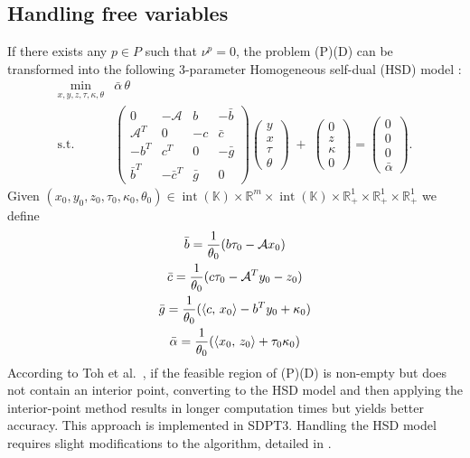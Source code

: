 \subsection{Handling free variables}
If there exists any $p \in P$ such that $\nu^p = 0$, the problem (P)(D) can be transformed into the following 3-parameter Homogeneous self-dual (HSD) model \cite{Wright1997}:
\[
  \begin{array}{cl}
   \min_{x,y,z,\tau,\kappa,\theta} & \bar{\alpha}\,\theta \\[3pt]
   \text{s.t.}
   & \begin{pmatrix}
       0 & -\mathcal{A} & b & -\bar{b}\\
       \mathcal{A}^T & 0 & -c & \bar{c}\\
       -b^T & c^T & 0 & -\bar{g}\\
       \bar{b}^T & -\bar{c}^T & \bar{g} & 0
     \end{pmatrix}
     \begin{pmatrix} y \\ x \\ \tau \\ \theta \end{pmatrix}
   \;+\;
     \begin{pmatrix} 0 \\ z \\ \kappa \\ 0 \end{pmatrix}
   =
     \begin{pmatrix} 0 \\ 0 \\ 0 \\ \bar{\alpha} \end{pmatrix}.
  \end{array}
\]
Given $(x_0,y_0,z_0,\tau_0,\kappa_0,\theta_0)\in 
  \operatorname{int}(\mathbb{K}) \times \mathbb{R}^m \times \operatorname{int}(\mathbb{K})
  \times \mathbb{R}^1_+ \times \mathbb{R}^1_+ \times \mathbb{R}^1_+$
we define
\begin{gather*}
    \bar{b} = \frac{1}{\theta_0}(b\tau_0 - \mathcal{A}x_0) \\
    \bar{c} = \frac{1}{\theta_0}(c\tau_0 - \mathcal{A}^T y_0 - z_0) \\
    \bar{g} = \frac{1}{\theta_0}(\left\langle c, \, x_0 \right\rangle - b^Ty_0 + \kappa_0) \\
    \bar{\alpha} = \frac{1}{\theta_0} (\left\langle x_0, \, z_0 \right\rangle + \tau_0 \kappa_0)
\end{gather*}
According to Toh et al.~\cite{toh1999}, if the feasible region of (P)(D) is non-empty but does not contain an interior point, converting to the HSD model and then applying the interior-point method results in longer computation times but yields better accuracy.
This approach is implemented in SDPT3.  
Handling the HSD model requires slight modifications to the algorithm, detailed in \cite{toh1999}.

